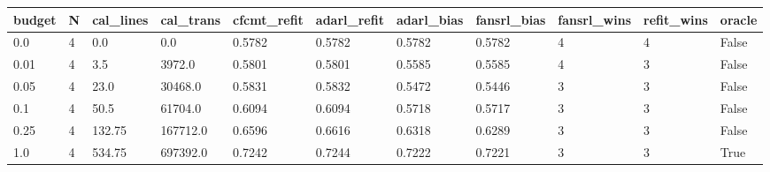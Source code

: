 \begin{tabular}{lllllllllll}
\toprule
budget & N & cal\_lines & cal\_trans & cfcmt\_refit & adarl\_refit & adarl\_bias & fansrl\_bias & fansrl\_wins & refit\_wins & oracle \\
\midrule
0.0 & 4 & 0.0 & 0.0 & 0.5782 & 0.5782 & 0.5782 & 0.5782 & 4 & 4 & False \\
0.01 & 4 & 3.5 & 3972.0 & 0.5801 & 0.5801 & 0.5585 & 0.5585 & 4 & 3 & False \\
0.05 & 4 & 23.0 & 30468.0 & 0.5831 & 0.5832 & 0.5472 & 0.5446 & 3 & 3 & False \\
0.1 & 4 & 50.5 & 61704.0 & 0.6094 & 0.6094 & 0.5718 & 0.5717 & 3 & 3 & False \\
0.25 & 4 & 132.75 & 167712.0 & 0.6596 & 0.6616 & 0.6318 & 0.6289 & 3 & 3 & False \\
1.0 & 4 & 534.75 & 697392.0 & 0.7242 & 0.7244 & 0.7222 & 0.7221 & 3 & 3 & True \\
\bottomrule
\end{tabular}
